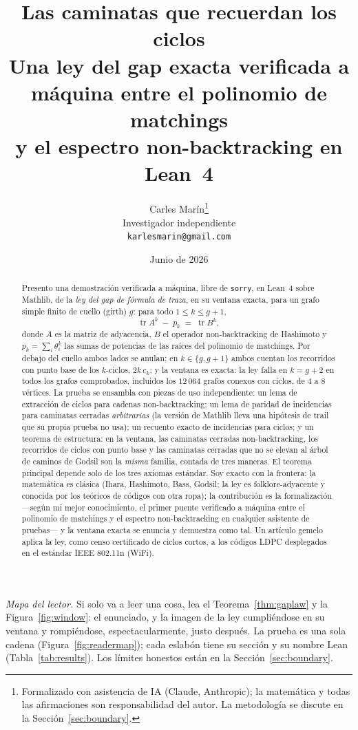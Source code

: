\documentclass[11pt]{article}
\title{\bf Las caminatas que recuerdan los ciclos\\[4pt]
  \large\normalfont Una ley del gap exacta verificada a máquina entre el polinomio
  de matchings\\ y el espectro non-backtracking en Lean~4}
\author{Carles Mar\'in\thanks{Formalizado con asistencia de IA (Claude, Anthropic); la
matemática y todas las afirmaciones son responsabilidad del autor. La metodología se discute
en la Sección~\ref{sec:boundary}.}\\[3pt]
  \normalsize Investigador independiente\\
  \normalsize \texttt{karlesmarin@gmail.com}}
\date{Junio de 2026}
\newcommand{\lean}[1]{\texttt{#1}}
\DeclareMathOperator{\tr}{tr}
\begin{document}
\maketitle

\begin{abstract}
Presento una demostración verificada a máquina, libre de \lean{sorry}, en Lean~4 sobre
Mathlib, de la \emph{ley del gap de fórmula de traza}, en su ventana exacta, para un grafo
simple finito de cuello (girth) $g$: para todo $1 \le k \le g+1$,
\[
\tr A^k \;-\; p_k \;=\; \tr B^k,
\]
donde $A$ es la matriz de adyacencia, $B$ el operador non-backtracking de Hashimoto y
$p_k = \sum_i \theta_i^k$ las sumas de potencias de las raíces del polinomio de matchings.
Por debajo del cuello ambos lados se anulan; en $k \in \{g, g+1\}$ ambos cuentan los
recorridos con punto base de los $k$-ciclos, $2k\,c_k$; y la ventana es exacta: la
ley falla en $k = g+2$ en todos los grafos comprobados, incluidos los $12\,064$ grafos
conexos con ciclos, de $4$ a $8$ vértices. La prueba se ensambla con piezas de uso
independiente: un lema de extracción de ciclos para cadenas non-backtracking; un lema de
paridad de incidencias para caminatas cerradas \emph{arbitrarias} (la versión de Mathlib
lleva una hipótesis de trail que su propia prueba no usa); un recuento exacto de incidencias
para ciclos; y un teorema de estructura: en la ventana, las caminatas cerradas
non-backtracking, los recorridos de ciclos con punto base y las caminatas cerradas que no
se elevan al árbol de caminos de Godsil son la \emph{misma} familia, contada de tres
maneras. El teorema principal depende solo de los tres axiomas estándar. Soy exacto con la
frontera: la matemática es clásica (Ihara, Hashimoto, Bass, Godsil; la ley es
folklore-adyacente y conocida por los teóricos de códigos con otra ropa); la contribución es
la formalización ---según mi mejor conocimiento, el primer puente verificado a máquina entre
el polinomio de matchings y el espectro non-backtracking en cualquier asistente de
pruebas--- y la ventana exacta se enuncia y demuestra como tal. Un artículo gemelo aplica la
ley, como censo certificado de ciclos cortos, a los códigos LDPC desplegados en el estándar
IEEE 802.11n (WiFi).
\end{abstract}

\noindent\emph{Mapa del lector.} Si solo va a leer una cosa, lea el
Teorema~\ref{thm:gaplaw} y la Figura~\ref{fig:window}: el enunciado, y la imagen de la ley
cumpliéndose en su ventana y rompiéndose, espectacularmente, justo después. La prueba es una
sola cadena (Figura~\ref{fig:readermap}); cada eslabón tiene su sección y su nombre Lean
(Tabla~\ref{tab:results}). Los límites honestos están en la Sección~\ref{sec:boundary}.
\end{document}
